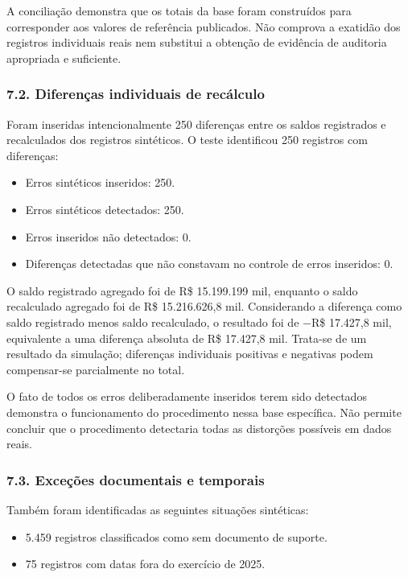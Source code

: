 \documentclass[
]{article}
\providecommand{\tightlist}{%
  \setlength{\itemsep}{0pt}\setlength{\parskip}{0pt}}
\begin{document}
A conciliação demonstra que os totais da base foram construídos para
corresponder aos valores de referência publicados. Não comprova a
exatidão dos registros individuais reais nem substitui a obtenção de
evidência de auditoria apropriada e suficiente.

\subsubsection{7.2. Diferenças individuais de
recálculo}\label{diferenuxe7as-individuais-de-recuxe1lculo}

Foram inseridas intencionalmente 250 diferenças entre os saldos
registrados e recalculados dos registros sintéticos. O teste identificou
250 registros com diferenças:

\begin{itemize}
\tightlist
\item
  Erros sintéticos inseridos: 250.
\item
  Erros sintéticos detectados: 250.
\item
  Erros inseridos não detectados: 0.
\item
  Diferenças detectadas que não constavam no controle de erros
  inseridos: 0.
\end{itemize}

O saldo registrado agregado foi de R\$ 15.199.199 mil, enquanto o saldo
recalculado agregado foi de R\$ 15.216.626,8 mil. Considerando a
diferença como saldo registrado menos saldo recalculado, o resultado foi
de −R\$ 17.427,8 mil, equivalente a uma diferença absoluta de R\$
17.427,8 mil. Trata-se de um resultado da simulação; diferenças
individuais positivas e negativas podem compensar-se parcialmente no
total.

O fato de todos os erros deliberadamente inseridos terem sido detectados
demonstra o funcionamento do procedimento nessa base específica. Não
permite concluir que o procedimento detectaria todas as distorções
possíveis em dados reais.

\subsubsection{7.3. Exceções documentais e
temporais}\label{exceuxe7uxf5es-documentais-e-temporais}

Também foram identificadas as seguintes situações sintéticas:

\begin{itemize}
\tightlist
\item
  5.459 registros classificados como sem documento de suporte.
\item
  75 registros com datas fora do exercício de 2025.
\end{itemize}
\end{document}

